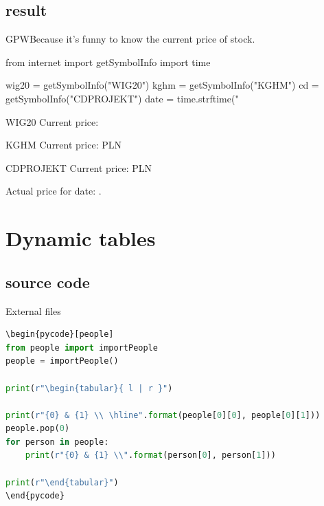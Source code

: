 \documentclass[
aspectratio=1610,
hyperref={pdfpagemode=FullScreen},
english,
usenames,
dvipsnames
]
{beamer} %
\begin{document}
\subsection{result}
\begin{frame}[fragile]{GPW}{Because it's funny to know the current price of stock.}
\begin{pycode}[internet]
from internet import getSymbolInfo
import time

wig20 = getSymbolInfo("WIG20")
kghm = getSymbolInfo("KGHM")
cd = getSymbolInfo("CDPROJEKT")
date = time.strftime("%
\end{pycode}


\begin{exampleblock}{WIG20}
Current price: 
\end{exampleblock}

\begin{exampleblock}{KGHM}
Current price:  PLN
\end{exampleblock}

\begin{exampleblock}{CDPROJEKT}
Current price:  PLN
\end{exampleblock}

Actual price for date: .

\onslide
\end{frame}

\section{Dynamic tables}
\subsection{source code}
\begin{frame}[fragile]{External files}
\begin{lstlisting}[language=python]
\begin{pycode}[people]
from people import importPeople
people = importPeople()	

print(r"\begin{tabular}{ l | r }")

print(r"{0} & {1} \\ \hline".format(people[0][0], people[0][1]))
people.pop(0)
for person in people:
	print(r"{0} & {1} \\".format(person[0], person[1]))
	
print(r"\end{tabular}")
\end{pycode}

\end{lstlisting}
\end{frame}
\end{document}
